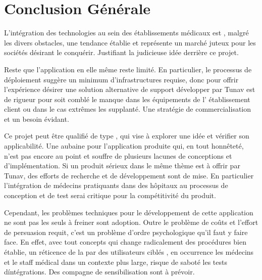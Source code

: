 
\chapter{Conclusion Générale}   

L'intégration des technologies au sein des établissements médicaux est , malgré
les divers obstacles, une tendance établie et représente un marché juteux pour
les sociétés désirant le conquérir. Justifiant la judicieuse idée derrière ce
projet.

Reste que l'application en elle même reste limité. En particulier, le processus
de déploiement  suggère un minimum d'infrastructures requise, donc pour offrir
l'expérience désirer une solution alternative de support développer par Tunav
est de rigueur pour soit comblé le manque dans les équipements de
l’ établissement client ou dans le cas extrêmes les supplanté. Une stratégie de
commercialisation et un besoin évidant.

Ce projet peut être qualifié de type , qui vise à explorer
une idée et vérifier son applicabilité. Une aubaine pour l'application produite
qui, en tout honnêteté, n'est pas encore au point et souffre de plusieurs
lacunes de conceptions et d'implémentation. Si un produit sérieux dans le même
thème est à offrir par Tunav, des efforts de recherche et de développement sont
de mise. En particulier l'intégration de médecins pratiquants dans des hôpitaux
au processus de conception et de test serai critique pour la compétitivité du
produit.

Cependant, les problèmes techniques pour le développement de cette application
ne sont pas les seuls à freiner sont adoption. Outre le problème de coûts  et
l'effort de persuasion requit, c'est un problème d'ordre psychologique qu'il
faut y faire face. En effet, avec tout concepts qui change radicalement des
procédures bien établie, un réticence de la par des utilisateurs ciblés , en
occurrence les médecins et le staff médical dans un contexte plus large, risque
de saboté les tests d\'intégrations. Des compagne de sensibilisation sont à
prévoir.